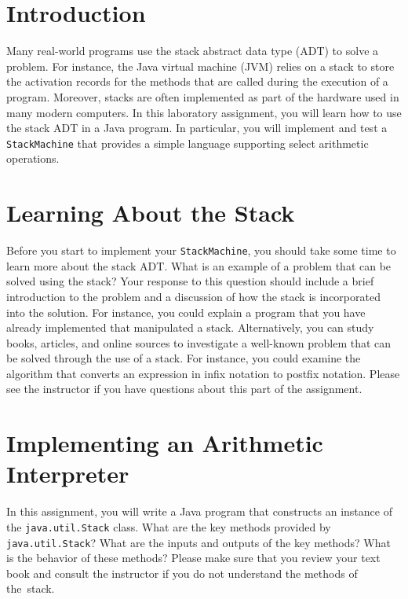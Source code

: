 


\usepackage[compact]{titlesec}


\section*{Introduction}

  Many real-world programs use the stack abstract data type (ADT) to solve a problem.  For instance, the Java virtual
  machine (JVM) relies on a stack to store the activation records for the methods that are called during the execution
  of a program.  Moreover, stacks are often implemented as part of the hardware used in many modern computers. In this
  laboratory assignment, you will learn how to use the stack ADT in a Java program.  In particular, you will implement
  and test a {\tt StackMachine} that provides a simple language supporting select arithmetic operations.

\section*{Learning About the Stack}

  Before you start to implement your {\tt StackMachine}, you should take some time to learn more about the stack ADT.
  What is an example of a problem that can be solved using the stack? Your response to this question should include a
  brief introduction to the problem and a discussion of how the stack is incorporated into the solution. For instance,
  you could explain a program that you have already implemented that manipulated a stack. Alternatively, you can study
  books, articles, and online sources to investigate a well-known problem that can be solved through the use of a stack.
  For instance, you could examine the algorithm that converts an expression in infix notation to postfix notation.
  Please see the instructor if you have questions about this part of the assignment.

\section*{Implementing an Arithmetic Interpreter}

  In this assignment, you will write a Java program that constructs an instance of the {\tt java.util.Stack} class. What
  are the key methods provided by {\tt java.util.Stack}? What are the inputs and outputs of the key methods? What is
  the behavior of these methods? Please make sure that you review your text book and consult the instructor if you do
  not understand the methods of \mbox{the stack}.

